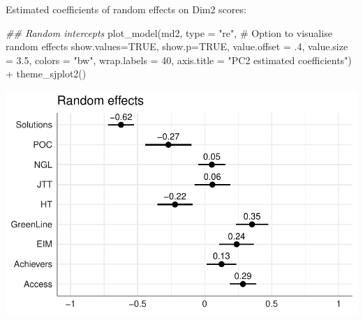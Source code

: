 \documentclass[
  letterpaper,
  DIV=11,
  numbers=noendperiod]{scrreprt}
\newenvironment{Shaded}{\begin{snugshade}}{\end{snugshade}}
\newcommand{\AttributeTok}[1]{\textcolor[rgb]{0.40,0.45,0.13}{#1}}
\newcommand{\CommentTok}[1]{\textcolor[rgb]{0.37,0.37,0.37}{#1}}
\newcommand{\ConstantTok}[1]{\textcolor[rgb]{0.56,0.35,0.01}{#1}}
\newcommand{\DecValTok}[1]{\textcolor[rgb]{0.68,0.00,0.00}{#1}}
\newcommand{\DocumentationTok}[1]{\textcolor[rgb]{0.37,0.37,0.37}{\textit{#1}}}
\newcommand{\FloatTok}[1]{\textcolor[rgb]{0.68,0.00,0.00}{#1}}
\newcommand{\FunctionTok}[1]{\textcolor[rgb]{0.28,0.35,0.67}{#1}}
\newcommand{\NormalTok}[1]{\textcolor[rgb]{0.00,0.23,0.31}{#1}}
\newcommand{\SpecialCharTok}[1]{\textcolor[rgb]{0.37,0.37,0.37}{#1}}
\newcommand{\StringTok}[1]{\textcolor[rgb]{0.13,0.47,0.30}{#1}}
\begin{document}
Estimated coefficients of random effects on Dim2 scores:

\begin{Shaded}
\begin{Highlighting}[]
\DocumentationTok{\#\# Random intercepts}
\FunctionTok{plot\_model}\NormalTok{(md2, }
           \AttributeTok{type =} \StringTok{"re"}\NormalTok{, }\CommentTok{\# Option to visualise random effects}
           \AttributeTok{show.values=}\ConstantTok{TRUE}\NormalTok{, }
           \AttributeTok{show.p=}\ConstantTok{TRUE}\NormalTok{,}
           \AttributeTok{value.offset =}\NormalTok{ .}\DecValTok{4}\NormalTok{,}
           \AttributeTok{value.size =} \FloatTok{3.5}\NormalTok{,}
           \AttributeTok{colors =} \StringTok{"bw"}\NormalTok{,}
           \AttributeTok{wrap.labels =} \DecValTok{40}\NormalTok{,}
           \AttributeTok{axis.title =} \StringTok{"PC2 estimated coefficients"}\NormalTok{) }\SpecialCharTok{+}
  \FunctionTok{theme\_sjplot2}\NormalTok{()}
\end{Highlighting}
\end{Shaded}

\includegraphics{E_Ch6_Analysis_files/figure-pdf/Dim2random-1.pdf}
\end{document}

